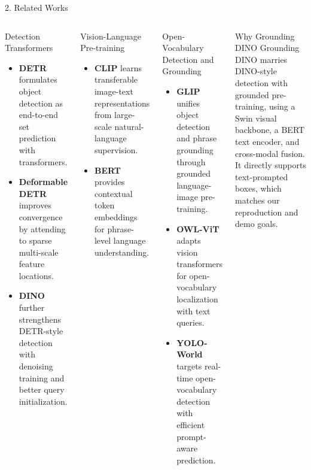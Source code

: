 \documentclass[aspectratio=169,10pt]{beamer}
\begin{document}
\begin{frame}{2. Related Works}
  \begin{columns}[T]
    \begin{block}{Detection Transformers}
      \footnotesize
      \begin{itemize}\setlength{\itemsep}{4pt}
        \item \textbf{DETR} formulates object detection as end-to-end set prediction with transformers.
        \item \textbf{Deformable DETR} improves convergence by attending to sparse multi-scale feature locations.
        \item \textbf{DINO} further strengthens DETR-style detection with denoising training and better query initialization.
      \end{itemize}
    \end{block}

    \vspace{0.1cm}
    \begin{block}{Vision-Language Pre-training}
      \footnotesize
      \begin{itemize}\setlength{\itemsep}{4pt}
        \item \textbf{CLIP} learns transferable image-text representations from large-scale natural-language supervision.
        \item \textbf{BERT} provides contextual token embeddings for phrase-level language understanding.
      \end{itemize}
    \end{block}

    \begin{block}{Open-Vocabulary Detection and Grounding}
      \footnotesize
      \begin{itemize}\setlength{\itemsep}{4pt}
        \item \textbf{GLIP} unifies object detection and phrase grounding through grounded language-image pre-training.
        \item \textbf{OWL-ViT} adapts vision transformers for open-vocabulary localization with text queries.
        \item \textbf{YOLO-World} targets real-time open-vocabulary detection with efficient prompt-aware prediction.
      \end{itemize}
    \end{block}

    \vspace{0.1cm}
    \begin{block}{Why Grounding DINO}
      \footnotesize
      Grounding DINO marries DINO-style detection with grounded pre-training, using a Swin visual backbone, a BERT text encoder, and cross-modal fusion. It directly supports text-prompted boxes, which matches our reproduction and demo goals.
    \end{block}
  \end{columns}
\end{frame}
\end{document}
